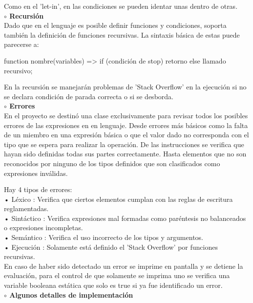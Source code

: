\documentclass[letterpaper]{article}
\begin{document}
{Como en el 'let-in', en las condiciones se pueden identar unas dentro de otras. \\

\textbf{{\large $\circ $ Recursión}} \\

Dado que en el lenguaje es posible definir funciones y condiciones, soporta también la definición de funciones recursivas.
La sintaxis básica de estas puede parecerse a:

\begin{center}
	function nombre(variables) => if (condición de stop) retorno else llamado recursivo;
\end{center}

En la recursión se manejarán problemas de 'Stack Overflow' en la ejecución si no se declara condición de parada correcta
o si se desborda. \\

\textbf{{\large $\circ $ Errores}}\\

En el proyecto se destinó una clase exclusivamente para revisar todos los posibles errores de las expresiones en en lenguaje.
Desde errores más básicos como la falta de un miembro en una expresión básica o que el valor dado no corresponda con el tipo
que se espera para realizar la operación. De las instrucciones se verifica que hayan sido definidas todas sus partes correctamente. 
Hasta elementos que no son reconocidos por ninguno de los tipos definidos que son clasificados como expresiones inválidas.

Hay 4 tipos de errores: \\
• Léxico : Verifica que ciertos elementos cumplan con las reglas de escritura reglamentadas. \\
• Sintáctico : Verifica expresiones mal formadas como paréntesis no balanceados o expresiones incompletas. \\
• Semántico : Verifica el uso incorrecto de los tipos y argumentos. \\
• Ejecución : Solamente está definido el 'Stack Overflow' por funciones recursivas. \\

En caso de haber sido detectado un error se imprime en pantalla y se detiene la evaluación, para el control de que solamente
se imprima uno se verifica una variable booleana estática que solo es true si ya fue identificado un error. \\

\textbf{{\large $\circ $ Algunos detalles de implementación}}\\

}
\end{document}
